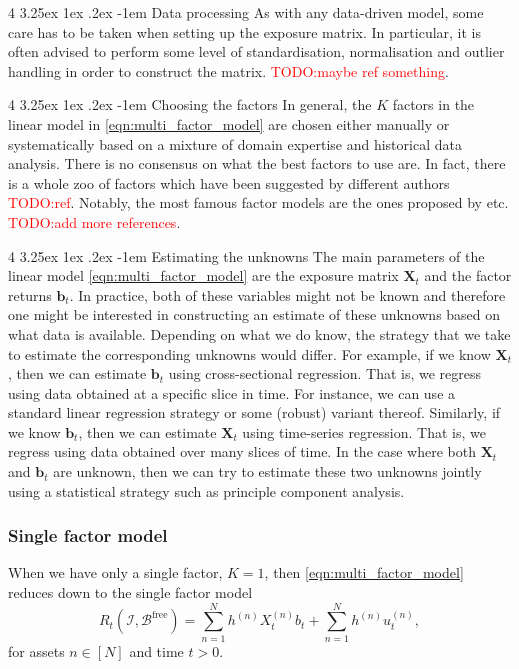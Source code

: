 \documentclass[12pt]{article}
\makeatletter
\renewcommand\paragraph{%
	\@startsection{paragraph}
	{4}
	{\z@}
	{3.25ex \@plus1ex \@minus.2ex}
	{-1em}
	{\normalfont\normalsize\bfseries\maybe@addperiod}%
}
\newcommand{\maybe@addperiod}[1]{%
	#1\@addpunct{.}%
}
\makeatother
\begin{document}
\paragraph{Data processing} As with any data-driven model, some care has to be taken when setting up the exposure matrix. In particular, it is often advised to perform some level of standardisation, normalisation and outlier handling in order to construct the matrix. \textcolor{red}{TODO:maybe ref something}.

\paragraph{Choosing the factors} In general, the $K$ factors in the linear model in \eqref{eqn:multi_factor_model} are chosen either manually or systematically based on a mixture of domain expertise and historical data analysis. There is no consensus on what the best factors to use are. In fact, there is a whole zoo of factors which have been suggested by different authors \textcolor{red}{TODO:ref}. Notably, the most famous factor models are the ones proposed by \cite{fama1993jofe} etc. \textcolor{red}{TODO:add more references}.

\paragraph{Estimating the unknowns} The main parameters of the linear model \eqref{eqn:multi_factor_model} are the exposure matrix $\mathbf{X}_t$ and the factor returns $\mathbf{b}_t$. In practice, both of these variables might not be known and therefore one might be interested in constructing an estimate of these unknowns based on what data is available. Depending on what we do know, the strategy that we take to estimate the corresponding unknowns would differ. For example, if we know $\mathbf{X}_t$, then we can estimate $\mathbf{b}_t$ using cross-sectional regression. That is, we regress using data obtained at a specific slice in time. For instance, we can use a standard linear regression strategy or some (robust) variant thereof. Similarly, if we know $\mathbf{b}_t$, then we can estimate $\mathbf{X}_t$ using time-series regression. That is, we regress using data obtained over many slices of time. In the case where both $\mathbf{X}_t$ and $\mathbf{b}_t$ are unknown, then we can try to estimate these two unknowns jointly using a statistical strategy such as principle component analysis.
\subsubsection{Single factor model}
When we have only a single factor, $K=1$, then \eqref{eqn:multi_factor_model} reduces down to the single factor model
\begin{equation}
	R_t(\mathcal{I}, \mathcal{B}^{\text{free}}) = \sum_{n=1}^N h^{(n)} X_t^{(n)} b_t + \sum_{n=1}^N h^{(n)} u^{(n)}_t,
\end{equation}
for assets $n \in [N]$ and time $t>0$. 
\end{document}
